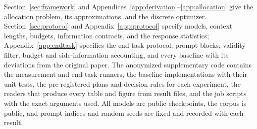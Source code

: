 \documentclass{article}
\theoremstyle{definition}
\begin{document}
Section~\ref{sec:framework} and Appendices~\ref{app:derivation}--\ref{app:allocation} give the allocation problem, its approximations, and the discrete optimizer.  Section~\ref{sec:protocol} and Appendix~\ref{app:protocol} specify models, context lengths, budgets, information contracts, and the response statistics; Appendix~\ref{app:endtask} specifies the end-task protocol, prompt blocks, validity filter, budget and side-information accounting, and every baseline with its deviations from the original paper.  The anonymized supplementary code contains the measurement and end-task runners, the baseline implementations with their unit tests, the pre-registered plans and decision rules for each experiment, the readers that produce every table and figure from result files, and the job scripts with the exact arguments used.  All models are public checkpoints, the corpus is public, and prompt indices and random seeds are fixed and recorded with each result.




\clearpage
\appendix

\end{document}
